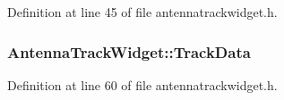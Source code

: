\-Definition at line 45 of file antennatrackwidget.\-h.

\hypertarget{group___antenna_track_gadget_plugin_ga18b3b7f2868671ca1d6e117f0bbccd90}{
\subsubsection[{\-Track\-Data}]{ {\bf \-Antenna\-Track\-Widget\-::\-Track\-Data}}}\label{group___antenna_track_gadget_plugin_ga18b3b7f2868671ca1d6e117f0bbccd90}


\-Definition at line 60 of file antennatrackwidget.\-h.



